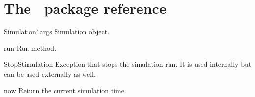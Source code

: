 \chapter{The \myhdl\ package reference}


\begin{classdesc}{Simulation}{*args}
Simulation object.

\begin{methoddesc}[Simulation]{run}{}
Run method.
\end{methoddesc}

\end{classdesc}

\begin{excdesc}{StopStimulation}
Exception that stops the simulation run. It is used internally but can
be used externally as well.
\end{excdesc}

\begin{funcdesc}{now}{}
Return the current simulation time.
\end{funcdesc}


